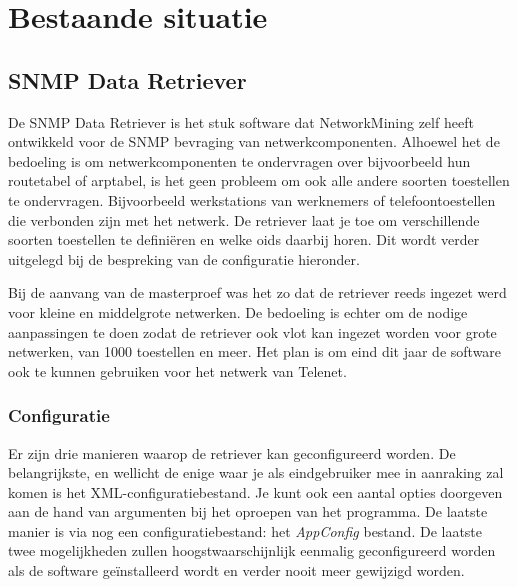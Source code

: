\chapter{Bestaande situatie}

\section{SNMP Data Retriever}
\label{snmp-data-retriever}
De SNMP Data Retriever is het stuk software dat NetworkMining zelf heeft ontwikkeld voor de SNMP bevraging van netwerkcomponenten.
Alhoewel het de bedoeling is om netwerkcomponenten te ondervragen over bijvoorbeeld hun routetabel of \gls{arptabel},
is het geen probleem om ook alle andere soorten toestellen te ondervragen. Bijvoorbeeld werkstations van werknemers of
telefoontoestellen die verbonden zijn met het netwerk. De retriever laat je toe om verschillende soorten toestellen te
definiëren en welke \glspl{oid} daarbij horen. Dit wordt verder uitgelegd bij de bespreking van de configuratie hieronder.

Bij de aanvang van de masterproef was het zo dat de retriever reeds ingezet werd voor kleine en middelgrote netwerken.
De bedoeling is echter om de nodige aanpassingen te doen zodat de retriever ook vlot kan ingezet worden voor grote netwerken,
van 1000 toestellen en meer. Het plan is om eind dit jaar de software ook te kunnen gebruiken voor het netwerk van Telenet. 



\subsection{Configuratie}
\label{snmp-data-retriever-configuratie}
Er zijn drie manieren waarop de retriever kan geconfigureerd worden. De belangrijkste,
en wellicht de enige waar je als eindgebruiker mee in aanraking zal komen is het XML-configuratiebestand.
Je kunt ook een aantal opties doorgeven aan de hand van argumenten bij het oproepen van het programma.
De laatste manier is via nog een configuratiebestand: het \emph{AppConfig} bestand. De laatste twee mogelijkheden
zullen hoogstwaarschijnlijk eenmalig geconfigureerd worden als de software geïnstalleerd wordt en verder nooit meer gewijzigd worden.

